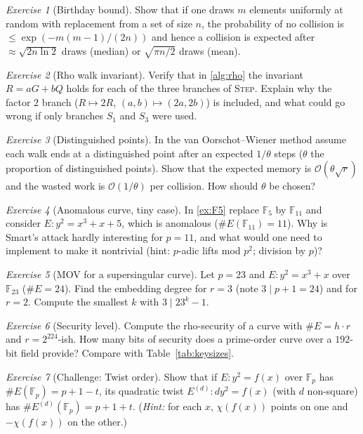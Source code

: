 \documentclass[11pt,a4paper,oneside]{book}
\theoremstyle{plain}
\theoremstyle{definition}
\theoremstyle{remark}
\newtheorem{exercise}{Exercise}[chapter]
\newcommand{\F}{\mathbb{F}}
\newcommand{\Fp}{\mathbb{F}_p}
\newcommand{\bigO}{\mathcal{O}}
\begin{document}
\begin{exercise}[Birthday bound]
Show that if one draws $m$ elements uniformly at random with replacement from a set of size $n$, the probability of no collision is $\le\exp(-m(m-1)/(2n))$ and hence a collision is expected after $\approx\sqrt{2n\ln 2}$ draws (median) or $\sqrt{\pi n/2}$ draws (mean).
\end{exercise}

\begin{exercise}[Rho walk invariant]
Verify that in \cref{alg:rho} the invariant $R=aG+bQ$ holds for each of the three branches of \textsc{Step}. Explain why the factor $2$ branch ($R\mapsto2R$, $(a,b)\mapsto(2a,2b)$) is included, and what could go wrong if only branches $S_1$ and $S_3$ were used.
\end{exercise}

\begin{exercise}[Distinguished points]
In the van Oorschot--Wiener method assume each walk ends at a distinguished point after an expected $1/\theta$ steps ($\theta$ the proportion of distinguished points). Show that the expected memory is $\bigO(\theta\sqrt{r})$ and the wasted work is $\bigO(1/\theta)$ per collision. How should $\theta$ be chosen?
\end{exercise}

\begin{exercise}[Anomalous curve, tiny case]
In \cref{ex:F5} replace $\F_5$ by $\F_{11}$ and consider $E:y^2=x^3+x+5$, which is anomalous ($\#E(\F_{11})=11$). Why is Smart's attack hardly interesting for $p=11$, and what would one need to implement to make it nontrivial (hint: $p$-adic lifts mod $p^2$; division by $p$)?
\end{exercise}

\begin{exercise}[MOV for a supersingular curve]
Let $p=23$ and $E:y^2=x^3+x$ over $\F_{23}$ ($\#E=24$). Find the embedding degree for $r=3$ (note $3\mid p+1=24$) and for $r=2$. Compute the smallest $k$ with $3\mid23^k-1$.
\end{exercise}

\begin{exercise}[Security level]
Compute the rho-security of a curve with $\#E=h\cdot r$ and $r=2^{224}$-ish. How many bits of security does a prime-order curve over a $192$-bit field provide? Compare with Table~\ref{tab:keysizes}.
\end{exercise}

\begin{exercise}[Challenge: Twist order]
Show that if $E:y^2=f(x)$ over $\Fp$ has $\#E(\Fp)=p+1-t$, its quadratic twist $E^{(d)}:dy^2=f(x)$ (with $d$ non-square) has $\#E^{(d)}(\Fp)=p+1+t$. (\emph{Hint:} for each $x$, $\chi(f(x))$ points on one and $-\chi(f(x))$ on the other.)
\end{exercise}
\end{document}
